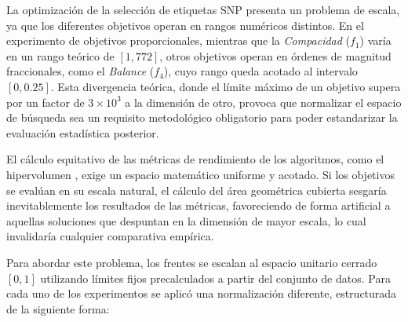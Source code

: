 La optimización de la selección de etiquetas SNP presenta un problema de escala, ya que los diferentes objetivos operan en rangos numéricos distintos. En el experimento de objetivos proporcionales, mientras que la \textit{Compacidad} ($f_1$) varía en un rango teórico de $[1, 772]$, otros objetivos operan en órdenes de magnitud fraccionales, como el \textit{Balance} ($f_4$), cuyo rango queda acotado al intervalo $[0, 0.25]$. Esta divergencia teórica, donde el límite máximo de un objetivo supera por un factor de $3 \times 10^3$ a la dimensión de otro, provoca que normalizar el espacio de búsqueda sea un requisito metodológico obligatorio para poder estandarizar la evaluación estadística posterior.

El cálculo equitativo de las métricas de rendimiento de los algoritmos, como el hipervolumen \cite{zitzler1999multiobjective}, exige un espacio matemático uniforme y acotado. Si los objetivos se evalúan en su escala natural, el cálculo del área geométrica cubierta sesgaría inevitablemente los resultados de las métricas, favoreciendo de forma artificial a aquellas soluciones que despuntan en la dimensión de mayor escala, lo cual invalidaría cualquier comparativa empírica.

Para abordar este problema, los frentes se escalan al espacio unitario cerrado $[0, 1]$ utilizando límites fijos precalculados a partir del conjunto de datos. Para cada uno de los experimentos se aplicó una normalización diferente, estructurada de la siguiente forma:


